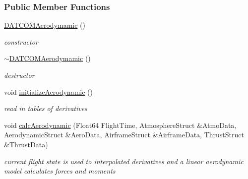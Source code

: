 \subsubsection*{Public Member Functions}
\begin{DoxyCompactItemize}
\item 
\mbox{\label{group___aerodynamic_a03d01a72cf389483e03e2bf6cce33299}} 
\hyperlink{group___aerodynamic_a03d01a72cf389483e03e2bf6cce33299}{D\+A\+T\+C\+O\+M\+Aerodymamic} ()
\begin{DoxyCompactList}\small\item\em constructor \end{DoxyCompactList}\item 
\mbox{\label{group___aerodynamic_a3619e38867cad4b0c8b06a939281a74e}} 
\hyperlink{group___aerodynamic_a3619e38867cad4b0c8b06a939281a74e}{$\sim$\+D\+A\+T\+C\+O\+M\+Aerodymamic} ()
\begin{DoxyCompactList}\small\item\em destructor \end{DoxyCompactList}\item 
\mbox{\label{group___aerodynamic_ad3c279c14de819e19e443568d7d46aff}} 
void \hyperlink{group___aerodynamic_ad3c279c14de819e19e443568d7d46aff}{initialize\+Aerodynamic} ()
\begin{DoxyCompactList}\small\item\em read in tables of derivatives \end{DoxyCompactList}\item 
\mbox{\label{group___aerodynamic_a2c31940a25ec9396657d701ef3004327}} 
void \hyperlink{group___aerodynamic_a2c31940a25ec9396657d701ef3004327}{calc\+Aerodynamic} (Float64 Flight\+Time, Atmosphere\+Struct \&Atmo\+Data, Aerodynamic\+Struct \&Aero\+Data, Airframe\+Struct \&Airframe\+Data, Thrust\+Struct \&Thrust\+Data)
\begin{DoxyCompactList}\small\item\em current flight state is used to interpolated derivatives and a linear aerodynamic model calculates forces and moments \end{DoxyCompactList}\end{DoxyCompactItemize}
